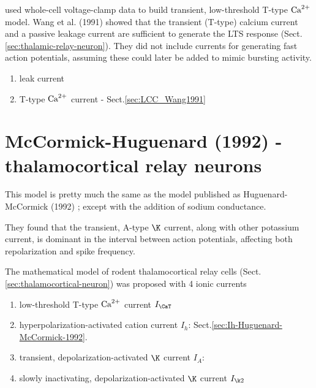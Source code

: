 \citep{wang1991} used whole-cell voltage-clamp data to build  transient,
low-threshold T-type ${\text{Ca}^{2+}}$ model. Wang et al. (1991) showed that the transient
(T-type) calcium current and a passive leakage current are sufficient to
generate the LTS response (Sect.\ref{sec:thalamic-relay-neuron}).
They did not include currents for generating fast action potentials, assuming
these could later be added to mimic bursting activity.

\begin{enumerate}
  \item leak current
  \item T-type ${\text{Ca}^{2+}}$ current - Sect.\ref{sec:LCC_Wang1991}
\end{enumerate}





\section{McCormick-Huguenard (1992) - thalamocortical relay neurons}
\label{sec:relay-neuron-McCormick-Huguenard-1992}
\label{sec:McCormick-Huguenard-1992}
\label{sec:Huguenard-Mccormick-1992}

This model is pretty much the same as the model published as Huguenard-McCormick
(1992) \cite{huguenard1992}; except with the addition of sodium conductance.

They found that the transient, A-type $\K$ current, along with other potassium
current, is dominant in the interval between action potentials, affecting both
repolarization and spike frequency. 
 
The mathematical model of rodent thalamocortical relay cells
(Sect.\ref{sec:thalamocortical-neuron}) was proposed with 4 ionic currents
\begin{enumerate}
  \item low-threshold T-type ${\text{Ca}^{2+}}$ current $I_\CaT$
  
  \item hyperpolarization-activated cation current $I_h$:
  Sect.\ref{sec:Ih-Huguenard-McCormick-1992}.
  
  \item transient, depolarization-activated $\K$ current $I_A$:
  
  \item slowly inactivating, depolarization-activated $\K$ current $I_{\k2}$
\end{enumerate}



